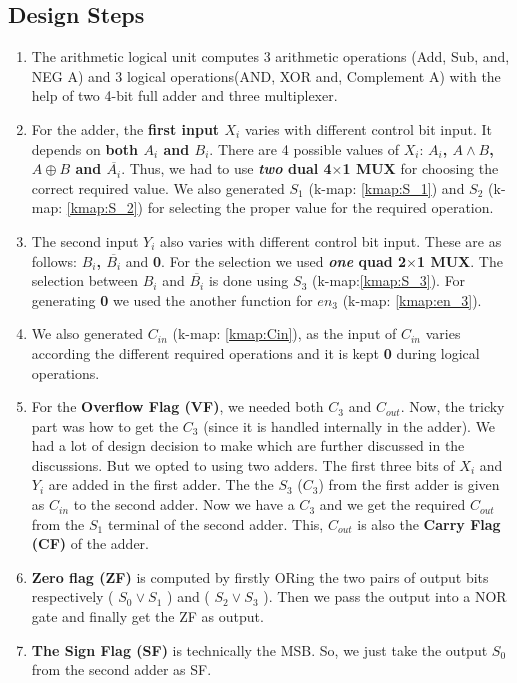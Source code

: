 \documentclass[12pt]{article}
\begin{document}
\subsection{Design Steps}
\begin{enumerate}
    \item The arithmetic logical unit computes 3 arithmetic operations (Add, Sub,  and, NEG A) and 3 logical operations(AND, XOR and, Complement A)  with the help of two 4-bit full adder and three multiplexer. 

    \item For the adder, the \textbf{first input $X_i$}  varies with different control bit input. It depends on \textbf{both $A_i$ and $B_i$}. There are 4 possible values of $X_i$: \textbf{$A_i$, $A \land B$, $A \oplus B$ and $\overline{A_i}$}. Thus, we had to use \textbf{\textit{two} dual 4$\times$1 MUX} for choosing the correct required value. We also generated $S_1$ (k-map: \ref{kmap:S_1}) and $S_2$ (k-map: \ref{kmap:S_2}) for selecting the proper value for the required operation. 

    \item The second input $Y_i$ also varies with different control bit input. These are as follows: \textbf{$B_i$, $\overline{B_i}$} and \textbf{0}. For the selection we used \textbf{\textit{one} quad 2$\times$1 MUX}. The selection between  $B_i$ and $\overline{B_i}$ is done using $S_3$ (k-map:\ref{kmap:S_3}). For generating \textbf{0} we used the another function for $en_3$ (k-map: \ref{kmap:en_3}).

    \item We also generated $C_{in}$ (k-map: \ref{kmap:Cin}), as the input of $C_{in}$  varies according the different required operations and it is kept \textbf{0} during logical operations.
    
    \item For the \textbf{Overflow Flag (VF)}, we needed both $C_3$ and $C_{out}$. Now, the tricky part was how to get the $C_3$ (since it is handled internally in the adder). We had a lot of design decision to make which are further discussed in the discussions. But we opted to using two adders. The first three bits of $X_i$ and $Y_i$ are added in the first adder. The the $S_3$ ($C_3$) from the first adder is given as $C_{in}$ to the second adder. Now we have a $C_3$ and we get the required $C_{out}$ from the $S_1$ terminal of the second adder. This, $C_{out}$ is also the \textbf{Carry Flag (CF)} of the adder.

    \item \textbf{Zero flag (ZF)} is computed by firstly ORing the two pairs of output bits respectively ( $S_0 \lor S_1 $ ) and ( $S_2 \lor S_3$ ). Then we pass the output into a NOR gate and finally get the ZF as output. 

    \item \textbf{The Sign Flag (SF)} is technically the MSB. So, we just take the output $S_0$ from the second adder as SF.

\end{enumerate}
\newpage
\end{document}
